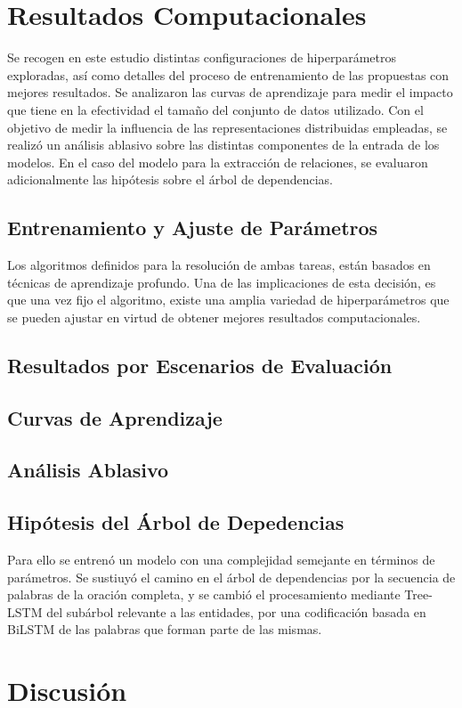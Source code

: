 \section{Resultados Computacionales}

Se recogen en este estudio distintas configuraciones de hiperparámetros exploradas, así como detalles del proceso de entrenamiento de las propuestas con mejores resultados.
Se analizaron las curvas de aprendizaje para medir el impacto que tiene en la efectividad el tamaño del conjunto de datos utilizado.
Con el objetivo de medir la influencia de las representaciones distribuidas empleadas, se realizó un análisis ablasivo sobre las distintas componentes de la entrada de los modelos.
En el caso del modelo para la extracción de relaciones, se evaluaron adicionalmente las hipótesis sobre el árbol de dependencias.

\subsection{Entrenamiento y Ajuste de Parámetros}

Los algoritmos definidos para la resolución de ambas tareas, están basados en técnicas de aprendizaje profundo.
Una de las implicaciones de esta decisión, es que una vez fijo el algoritmo, existe una amplia variedad de hiperparámetros que se pueden ajustar en virtud de obtener mejores resultados computacionales.

\subsection{Resultados por Escenarios de Evaluación}

\subsection{Curvas de Aprendizaje}

\subsection{Análisis Ablasivo}

\subsection{Hipótesis del Árbol de Depedencias}

Para ello se entrenó un modelo con una complejidad semejante en términos de parámetros.
Se sustiuyó el camino en el árbol de dependencias por la secuencia de palabras de la oración completa, y se cambió el procesamiento mediante Tree-LSTM del subárbol relevante a las entidades, por una codificación basada en BiLSTM de las palabras que forman parte de las mismas.


\section{Discusión}
